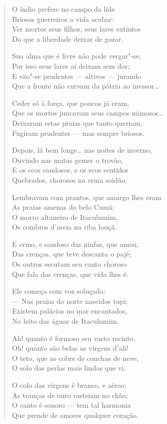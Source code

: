 \begin{verse}
O índio prefere no campo da lide\\
Briosos guerreiros a vida acabar:\\
Ver mortos seus filhos, seus lares extintos\\
Do que a liberdade deixar de gozar.

Sua alma que é livre não pode vergar"-se,\\
Por isso seus lares aí deixam sem dor;\\
E vão"-se prudentes --- altivos --- jurando\\
Que a fronte não curvam da pátria ao invasor\ldots{}

Ceder só à força, que poucos já eram,\\
Que os mortos juncavam seus campos mimosos\ldots{}\\
Deixaram estas praias que tanto queriam,\\
Fugiram prudentes --- mas sempre briosos.

Depois, lá bem longe\ldots{} nas noites de inverno,\\
Ouvindo nas matas gemer o trovão,\\
E os ecos saudosos, e os ecos sentidos\\
Quebrados, chorosos na erma soidão,

Lembravam com prantos, que amargo lhes eram\\
As praias amenas do belo Cumã;\\
O morro altaneiro de Itaculumim,\\
Os combros d'areia na riba louçã.

E ermo, e saudoso das ninfas, que amou,\\
Das crenças, que teve descanta o pajé;\\
Os outros escutam seu canto choroso\\
Que fala das crenças, que vida lhes é.

Ele começa com voz soluçada:\\
--- Nas praias do norte nascidos tupi;\\
Existem palácios no mar encantados,\\
No leito das águas de Itaculumim.

Ah! quanto é formoso seu vasto recinto,\\
Oh! quanto são belas as virgens d'ali!\\
O teto, que as cobre de conchas de neve,\\
O solo das perlas mais lindas que vi.

O colo das virgens é branco, e aéreo;\\
As tranças de ouro rasteiam no chão;\\
O canto é sonoro --- tem tal harmonia\\
Que prende de amores qualquer coração.


\end{verse}
